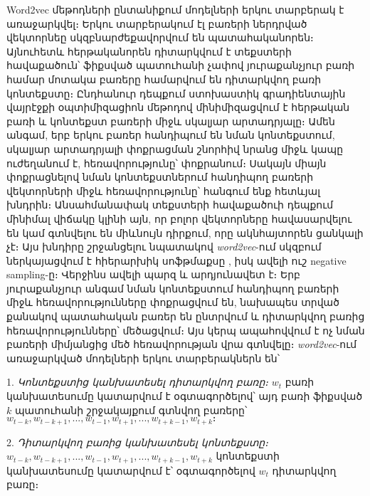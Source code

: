 \documentclass[11pt]{article}
\begin{document}
\par Word2vec մեթոդների ընտանիքում մոդելների երկու տարբերակ է առաջարկվել։ Երկու տարբերակում էլ բառերի ներդրված վեկտորնեը սկզբնարժեքավորվում են պատահականորեն։ Այնուհետև հերթականորեն դիտարկվում է  տեքստերի հավաքածուն՝ ֆիքսված պատուհանի չափով  յուրաքանչյուր բառի համար մոտակա բառերը համարվում են դիտարկվող բառի կոնտեքստը։ Ընդհանուր դեպքում ստոխաստիկ գրադիենտային վայրէջքի օպտիմիզացիոն մեթոդով մինիմիզացվում է  հերթական բառի և կոնտեքստ բառերի միջև սկալյար արտադրյալը։ Ամեն անգամ, երբ երկու բառեր հանդիպում են նման կոնտեքստում, սկալյար արտադրյալի փոքրացման շնորհիվ նրանց միջև կապը ուժեղանում է, հեռավորությունը՝ փոքրանում։ Սակայն միայն փոքրացնելով նման կոնտեքստներում հանդիպող բառերի վեկտորների միջև հեռավորությունը՝ հանգում ենք հետևյալ խնդրին։ Անսահմանափակ տեքստերի հավաքածուի դեպքում մինիմալ վիճակը կլինի այն, որ բոլոր վեկտորները հավասարվելու են կամ գտնվելու են միևնույն դիրքում, որը ակնհայտորեն ցանկալի չէ։ Այս խնդիրը շրջանցելու նպատակով \textit{word2vec}-ում 	սկզբում ներկայացվում է հիերարխիկ սոֆթմաքսը \cite{bib_item_27}, իսկ ավելի ուշ negative sampling-ը։ Վերջինս ավելի պարզ և արդյունավետ է։ Երբ յուրաքանչյուր անգամ նման կոնտեքստում հանդիպող բառերի միջև հեռավորությունները փոքրացվում են, նախապես տրված քանակով պատահական բառեր են ընտրվում և դիտարկվող բառից հեռավորությունները՝ մեծացվում։  Այս կերպ ապահովվում է ոչ նման բառերի միմյանցից մեծ հեռավորության վրա գտնվելը։ \textit{word2vec}-ում առաջարկված մոդելների երկու տարբերակներն են՝


\par 1. \textit{Կոնտեքստից կանխատեսել դիտարկվող բառը։} $w_t$ բառի կանխատեսումը կատարվում է օգտագործելով՝ այդ բառի ֆիքսված $k$ պատուհանի շրջակայքում գտնվող բառերը՝ $w_{t-k},w_{t-k+1},...,w_{t-1},w_{t+1},...,w_{t+k-1},w_{t+k}։$ 
\par 2.  \textit{Դիտարկվող բառից կանխատեսել կոնտեքստը։} $w_{t-k},w_{t-k+1},...,w_{t-1},w_{t+1},...,w_{t+k-1},w_{t+k}$  կոնտեքստի կանխատեսումը կատարվում է՝ օգտագործելով $w_t$ դիտարկվող բառը։ 
\end{document}
